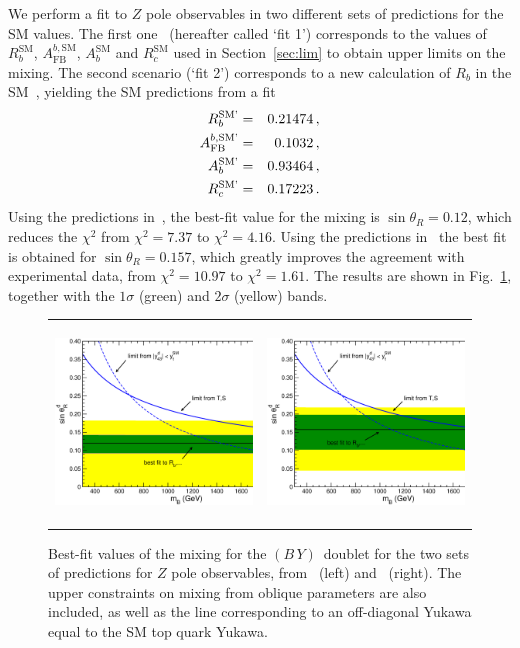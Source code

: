 \documentclass[12pt,a4paper]{article}
\newcommand{\by}{$(B\,Y)$}
\begin{document}
We perform a fit to $Z$ pole observables in two different sets of predictions for the SM values. The first one~\cite{Beringer:1900zz} (hereafter called `fit 1') corresponds to the values of $R_b^\text{SM}$, $A_\text{FB}^{b,\text{SM}}$, $A_b^\text{SM}$ and $R_c^\text{SM}$ used in Section~\ref{sec:lim} to obtain upper limits on the mixing. The second scenario (`fit 2') corresponds to a new calculation of $R_b$ in the SM~\cite{Freitas:2012sy}, yielding the SM predictions from a fit~\cite{Baak:2012kk}
\begin{eqnarray}
R_b^\text{SM'} & = & 0.21474 \,, \notag \\
A_\text{FB}^{b,\text{SM'}} & = & 0.1032 \,, \notag \\
A_b^\text{SM'} & = & 0.93464 \,, \notag \\
R_c^\text{SM'} & = & 0.17223 \,.
\end{eqnarray}
Using the predictions in~\cite{Beringer:1900zz}, the best-fit value for the mixing is $\sin \theta_R = 0.12$, which reduces the $\chi^2$ from $\chi^2 = 7.37$ to $\chi^2 = 4.16$. Using the predictions in~\cite{Baak:2012kk} the best fit is obtained for $\sin \theta_R = 0.157$, which greatly improves the agreement with experimental data, from $\chi^2 = 10.97$ to $\chi^2 = 1.61$. The results are shown in Fig.~\ref{fig:fit}, together with the $1\sigma$ (green) and $2\sigma$ (yellow) bands.
%
\begin{figure}[t]
\begin{center}
\begin{tabular}{cc}
\includegraphics[height=5.25cm]{fig7a.eps} & \includegraphics[height=5.25cm]{fig7b.eps}
\end{tabular}
\caption{Best-fit values of the mixing for the \by\ doublet for the two sets of predictions for $Z$ pole observables, from~\cite{Beringer:1900zz} (left) and~\cite{Baak:2012kk} (right). The upper constraints on mixing from oblique parameters are also included, as well as the line corresponding to an off-diagonal Yukawa equal to the SM top quark Yukawa.}
\label{fig:fit}
\end{center}
\end{figure}
\end{document}
